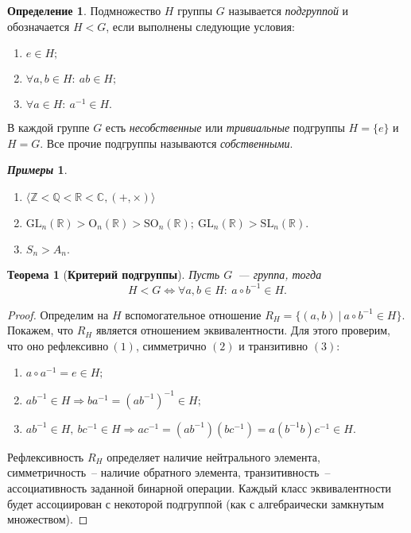 \documentclass[a4paper, 14pt]{extarticle}
\newcommand{\n}{\par}
\newcommand{\integers}{\mathbb{Z}}
\newcommand{\rationals}{\mathbb{Q}}
\newcommand{\real}{\mathbb{R}}
\newcommand{\complex}{\mathbb{C}}
\newcommand{\GL}{\mathrm{GL}}
\newcommand{\SL}{\mathrm{SL}}
\newcommand{\Orth}{\mathrm{O}}
\newcommand{\SOrth}{\mathrm{SO}}
\theoremstyle{definition}
\newtheorem*{exmpls}{\textit{Примеры}}
\newtheorem{definition}{Определение}
\theoremstyle{plain}
\newtheorem*{theorem*}{Теорема}
\numberwithin{theorem}{section}
\numberwithin{definition}{section}
\numberwithin{statement}{section}
\numberwithin{lemma}{section}
\numberwithin{consequence}{section}
\begin{document}
		\begin{definition}	
			Подмножество $H$ группы $G$ называется \textit{подгруппой} и обозначается $H < G$, если выполнены следующие условия:
			\begin{enumerate}
				\setlength\itemsep{0.1em}
				\item $e \in H;$
				\item $\forall a,b \in H{:} \ ab \in H;$
				\item $\forall a \in H{:} \ a^{-1} \in H.$
			\end{enumerate}
		\end{definition}
		В каждой группе $G$ есть \textit{несобственные} или \textit{тривиальные} подгруппы $H = \{e\}$ и $H = G$. Все прочие подгруппы называются \textit{собственными}.
		\begin{exmpls}
			\
			\begin{enumerate}
				\setlength\itemsep{0.1em}
				\item ${\langle \integers < \rationals < \real < \complex, (+, \times) \rangle}$
				\item ${\GL_n(\real) > \Orth_n(\real) > \SOrth_n(\real); \ \GL_n(\real) > \SL_n(\real).}$
				\item ${S_n > A_n.}$
			\end{enumerate}
		\end{exmpls}
		\begin{theorem*}[\textbf{Критерий подгруппы}]
			Пусть $G$~--- группа, тогда
			\begin{equation*}
				H < G \Longleftrightarrow \forall a,b \in H{:} \ a \circ b^{-1} \in H.
			\end{equation*}
		\end{theorem*}
		\begin{proof}
			Определим на $H$ вспомогательное отношение ${R_H = \{(a,b)\ | \ a \circ b^{-1} \in H\}}.$ Покажем, что $R_H$ является отношением эквивалентности. Для этого проверим, что оно ${\text{рефлексивно} \ (1)}$, симметрично $(2)$ и транзитивно $(3)$:
			\begin{enumerate}
				\setlength\itemsep{0.1em}
				\item $a \circ a^{-1} = e \in H;$
				\item $ab^{-1} \in H \Longrightarrow b a^{-1} = (ab^{-1})^{-1} \in H;$
				\item $ab^{-1} \in H, \ bc^{-1} \in H \Longrightarrow ac^{-1} = (ab^{-1})(bc^{-1}) = a(b^{-1}b)c^{-1} \in H.$
			\end{enumerate} \n
			
			Рефлексивность $R_H$ определяет наличие нейтрального элемента, симметричность~-- наличие обратного элемента, транзитивность~-- ассоциативность заданной бинарной операции. Каждый класс эквивалентности будет ассоциирован с некоторой подгруппой (как с алгебраически замкнутым множеством). 
		\end{proof}
\end{document}
